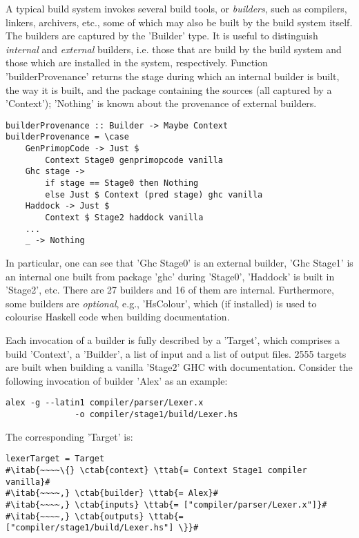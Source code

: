 A typical build system invokes several build tools, or \emph{builders}, such as
compilers, linkers, archivers, etc., some of which may also be built by the
build system itself. The builders are captured by the \lst'Builder' type. It
is useful to distinguish \emph{internal} and \emph{external} builders, i.e.
those that are build by the build system and those which are installed in the
system, respectively. Function \lst'builderProvenance' returns the stage
during which an internal builder is built, the way it is built, and the package
containing the sources (all captured by a \lst'Context'); \lst'Nothing' is
known about the provenance of external builders.

\begin{lstlisting}
builderProvenance :: Builder -> Maybe Context
builderProvenance = \case
    GenPrimopCode -> Just $
        Context Stage0 genprimopcode vanilla
    Ghc stage ->
        if stage == Stage0 then Nothing
        else Just $ Context (pred stage) ghc vanilla
    Haddock -> Just $
        Context $ Stage2 haddock vanilla
    ...
    _ -> Nothing
\end{lstlisting}

In particular, one can see that \lst'Ghc Stage0' is an external builder,
\lst'Ghc Stage1' is an internal one built from package \lst'ghc'
during \lst'Stage0', \lst'Haddock' is built in \lst'Stage2', etc. There are
27 builders and 16 of them are internal. Furthermore, some builders are
\emph{optional}, e.g., \lst'HsColour', which (if installed) is used to
colourise Haskell code when building documentation.

Each invocation of a builder is fully described by a \lst'Target', which
comprises a build \lst'Context', a \lst'Builder', a list of input and
a list of output files. 2555 targets are built when building a vanilla
\lst'Stage2' GHC with documentation. Consider the following invocation of
builder \lst'Alex' as an example:

\begin{verbatim}
alex -g --latin1 compiler/parser/Lexer.x
              -o compiler/stage1/build/Lexer.hs
\end{verbatim}

\noindent The corresponding \lst'Target' is:

\begin{lstlisting}
lexerTarget = Target
#\itab{~~~~\{} \ctab{context} \ttab{= Context Stage1 compiler vanilla}#
#\itab{~~~~,} \ctab{builder} \ttab{= Alex}#
#\itab{~~~~,} \ctab{inputs} \ttab{= ["compiler/parser/Lexer.x"]}#
#\itab{~~~~,} \ctab{outputs} \ttab{= ["compiler/stage1/build/Lexer.hs"] \}}#
\end{lstlisting}

